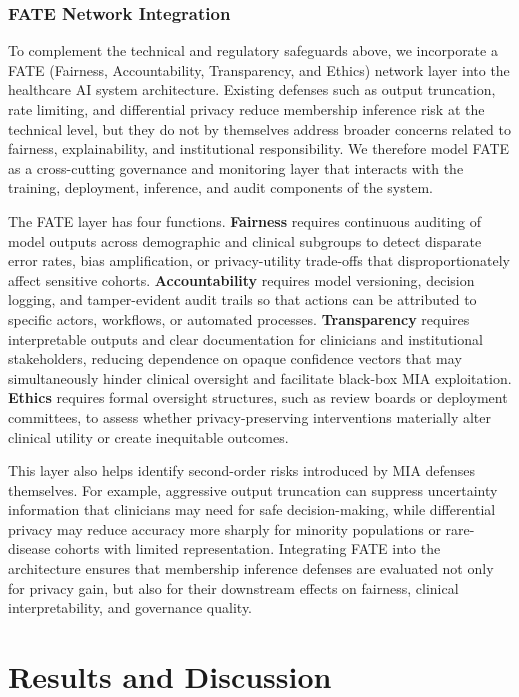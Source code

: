 \documentclass[conference]{IEEEtran}
\begin{document}
	\subsubsection{FATE Network Integration}
	To complement the technical and regulatory safeguards above, we incorporate a FATE (Fairness, Accountability, Transparency, and Ethics) network layer into the healthcare AI system architecture. Existing defenses such as output truncation, rate limiting, and differential privacy reduce membership inference risk at the technical level, but they do not by themselves address broader concerns related to fairness, explainability, and institutional responsibility. We therefore model FATE as a cross-cutting governance and monitoring layer that interacts with the training, deployment, inference, and audit components of the system.

	The FATE layer has four functions. \textbf{Fairness} requires continuous auditing of model outputs across demographic and clinical subgroups to detect disparate error rates, bias amplification, or privacy-utility trade-offs that disproportionately affect sensitive cohorts. \textbf{Accountability} requires model versioning, decision logging, and tamper-evident audit trails so that actions can be attributed to specific actors, workflows, or automated processes. \textbf{Transparency} requires interpretable outputs and clear documentation for clinicians and institutional stakeholders, reducing dependence on opaque confidence vectors that may simultaneously hinder clinical oversight and facilitate black-box MIA exploitation. \textbf{Ethics} requires formal oversight structures, such as review boards or deployment committees, to assess whether privacy-preserving interventions materially alter clinical utility or create inequitable outcomes.

	This layer also helps identify second-order risks introduced by MIA defenses themselves. For example, aggressive output truncation can suppress uncertainty information that clinicians may need for safe decision-making, while differential privacy may reduce accuracy more sharply for minority populations or rare-disease cohorts with limited representation. Integrating FATE into the architecture ensures that membership inference defenses are evaluated not only for privacy gain, but also for their downstream effects on fairness, clinical interpretability, and governance quality.

	\section{Results and Discussion}
\end{document}
